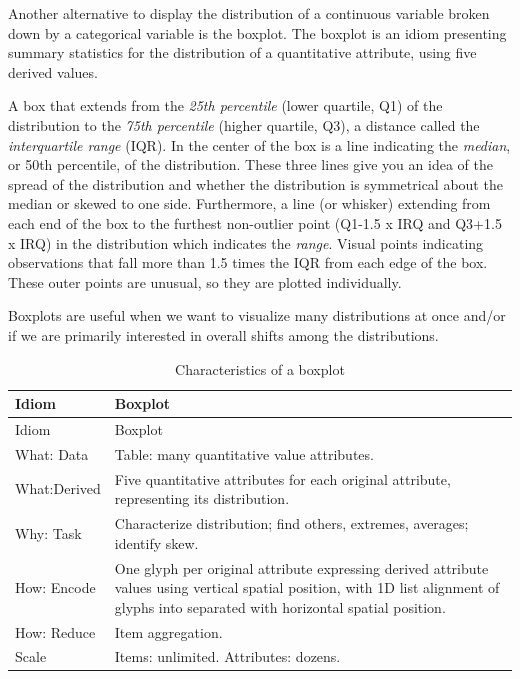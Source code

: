 \documentclass[
]{book}
\begin{document}
Another alternative to display the distribution of a continuous variable broken down by a categorical variable is the boxplot. The boxplot is an idiom presenting summary statistics for the distribution of a quantitative attribute, using five derived values.

A box that extends from the \emph{25th percentile} (lower quartile, Q1) of the distribution to the \emph{75th percentile} (higher quartile, Q3), a distance called the \emph{interquartile range} (IQR). In the center of the box is a line indicating the \emph{median}, or 50th percentile, of the distribution. These three lines give you an idea of the spread of the distribution and whether the distribution is symmetrical about the median or skewed to one side. Furthermore, a line (or whisker) extending from each end of the box to the furthest non-outlier point (Q1-1.5 x IRQ and Q3+1.5 x IRQ) in the distribution which indicates the \emph{range}. Visual points indicating observations that fall more than 1.5 times the IQR from each edge of the box. These outer points are unusual, so they are plotted individually.

Boxplots are useful when we want to visualize many distributions at once and/or if we are primarily interested in overall shifts among the distributions.

\begin{longtable}[]{@{}
  >{\raggedright\arraybackslash}p{}
  >{\raggedright\arraybackslash}p{}@{}}
\caption{Characteristics of a boxplot \citep{munzner2014visualization}}\tabularnewline
\toprule
Idiom & Boxplot \\
\midrule
\endfirsthead
\toprule
Idiom & Boxplot \\
\midrule
\endhead
What: Data & Table: many quantitative value attributes. \\
What:Derived & Five quantitative attributes for each original attribute, representing its distribution. \\
Why: Task & Characterize distribution; find others, extremes, averages; identify skew. \\
How: Encode & One glyph per original attribute expressing derived attribute values using vertical spatial position, with 1D list alignment of glyphs into separated with horizontal spatial position. \\
How: Reduce & Item aggregation. \\
Scale & Items: unlimited. Attributes: dozens. \\
\bottomrule
\end{longtable}
\end{document}
